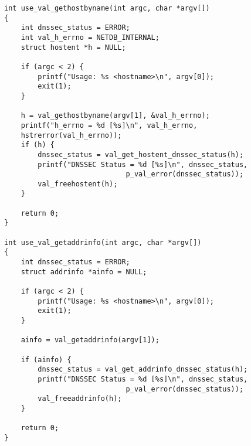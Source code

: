 \begin{verbatim}
int use_val_gethostbyname(int argc, char *argv[])
{
    int dnssec_status = ERROR;
    int val_h_errno = NETDB_INTERNAL;
    struct hostent *h = NULL;
                                                                                                                             
    if (argc < 2) {
        printf("Usage: %s <hostname>\n", argv[0]);
        exit(1);
    }
                                                                                                                             
    h = val_gethostbyname(argv[1], &val_h_errno);
    printf("h_errno = %d [%s]\n", val_h_errno,
    hstrerror(val_h_errno));
    if (h) {
        dnssec_status = val_get_hostent_dnssec_status(h);
        printf("DNSSEC Status = %d [%s]\n", dnssec_status,
                             p_val_error(dnssec_status));
        val_freehostent(h);
    }
                                                                                                                             
    return 0;
}

int use_val_getaddrinfo(int argc, char *argv[])
{
    int dnssec_status = ERROR;
    struct addrinfo *ainfo = NULL;
                                                                                                                             
    if (argc < 2) {
        printf("Usage: %s <hostname>\n", argv[0]);
        exit(1);
    }
                                                                                                                             
    ainfo = val_getaddrinfo(argv[1]);
                                                                                                                             
    if (ainfo) {
        dnssec_status = val_get_addrinfo_dnssec_status(h);
        printf("DNSSEC Status = %d [%s]\n", dnssec_status,
                             p_val_error(dnssec_status));
        val_freeaddrinfo(h);
    }
                                                                                                                             
    return 0;
}
\end{verbatim}
                                                                                                       

